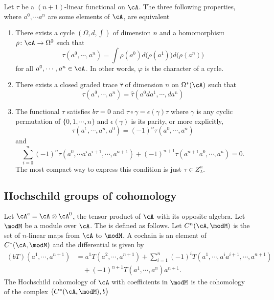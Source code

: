 \begin{proposition}
Let $\tau$ be a $(n+1)$-linear functional on $\cA$. The three following properties, where $a^0,\cdots a^n$ are some elements of $\cA$, are equivalent
\begin{enumerate}
\item There exists a cycle $(\Omega,d,\int)$ of dimension $n$ and a homomorphism $\rho\colon \cA\to \Omega^0$ such that
\[ 
  \tau(a^0,\cdots,a^{n})=\int \rho(a^0)d\big( \rho(a^1) \big)d\big( \rho(a^{n}) \big)
\]
for all $a^0,\cdots,a^{n}\in\cA$. In other words, $\varphi$ is the character of a cycle.
\item There exists a closed graded trace $\hat{\tau}$ of dimension $n$ on $\Omega^*(\cA)$ such that
\[ 
  \tau(a^0,\cdots,a^{n})=\hat{\tau}(a^0da^1,\cdots,da^{n})
\]
\item The functional $\tau$ satisfies $b\tau=0$ and $\tau\circ\gamma=\epsilon(\gamma)\tau$ where $\gamma$ is any cyclic permutation of $\{ 0,1,\cdots,n \}$ and $\epsilon(\gamma)$ is its parity, or more explicitly, 
\[ 
	\tau(a^1,\cdots,a^{n},a^0)=(-1)^n\tau(a^0,\cdots,a^{n})
\]
and
\[ 
   \sum_{i=0}^{n}(-1)^n\tau(a^0,\cdots a^ia^{i+1},\cdots,a^{n+1})+(-1)^{n+1}\tau(a^{n+1}a^0,\cdots,a^{n})=0.  
\]
The most compact way to express this condition is just $\tau\in Z^n_{\lambda}$.
\end{enumerate}
\end{proposition}

\subsection{Hochschild groups of cohomology}

Let $\cA^e=\cA\otimes\cA^0$, the tensor product of $\cA$ with its opposite algebra. Let $\modM$ be a module over $\cA$. The  is defined as follows. Let $C^n(\cA,\modM)$ is the set of $n$-linear maps from $\cA$ to $\modM$. A cochain is an element of $C^*(\cA,\modM)$ and the differential is given by
\begin{equation}
\begin{split}
(bT)(a^1,\cdots,a^{n+1})&=a^1T(a^2,\cdots,a^{n+1})+\sum_{i=1}^{n}(-1)^iT(a^1,\cdots,a^ia^{i+1},\cdots,a^{n+1})\\
				&\quad +(-1)^{n+1}T(a^1,\cdots,a^{n})a^{n+1}.
\end{split}
\end{equation}
The Hochschild cohomology of $\cA$ with coefficients in $\modM$ is the cohomology of the complex $\big( C^*(\cA,\modM),b \big)$

